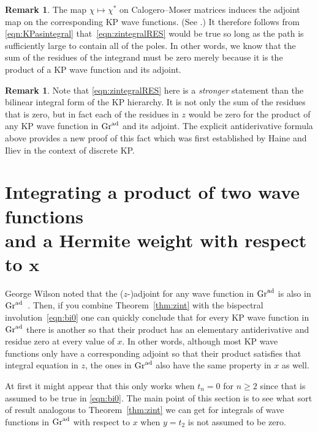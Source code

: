 \documentclass[10pt,a4paper]{amsart}
\numberwithin{equation}{section}
\theoremstyle{definition}
\newtheorem{Remark}[Theorem]{Remark}
\begin{document}
\begin{Remark}
The map $\chi\mapsto \chi^*$ on Calogero--Moser matrices induces the
adjoint map on the corresponding KP wave functions. (See \cite[Lemma 7.7]{WilsonCM}.)
It therefore follows from
\eqref{eqn:KPasintegral} that~\eqref{eqn:zintegralRES} would be true so long as the path is
sufficiently large to contain all of the poles. In other words,
we know that the sum of the residues of
the integrand must be zero merely because it is the product of a KP
wave function and its adjoint.
\end{Remark}
\begin{Remark}
Note that \eqref{eqn:zintegralRES} here is a \textit{stronger} statement
than the bilinear integral form of the KP hierarchy.
It is not only the sum of the residues that is zero, but in fact each
of the
residues in $z$ would be zero for the product of any KP wave function
in ${\rm Gr}^{\rm ad}$ and its adjoint.
The explicit antiderivative formula above provides a new proof of this fact which was first established
by Haine and Iliev \cite{HaineIliev} in the context of discrete KP.
\end{Remark}

\section[Integrating a product of two wave functions and a Hermite weight with respect to x]{Integrating a product of two wave functions\\ and a Hermite weight with respect to $ \boldsymbol{x}$}\label{sec:intx}

George Wilson noted that the ($z$-)adjoint for any wave function in
${\rm Gr}^{\rm ad}$ is also in ${\rm Gr}^{\rm ad}$~\cite{WilsonBisp}.
Then, if you combine Theorem~\ref{thm:zint}
with the bispectral involution~\eqref{eqn:bi0}
one can quickly conclude that for every KP wave function in ${\rm Gr}^{\rm ad}$ there is
another so that their product has an elementary antiderivative and
residue zero at every value of $x$. In other words, although most KP
wave functions only have a corresponding adjoint so that their product
satisfies that integral equation in $z$, the ones in ${\rm Gr}^{\rm ad}$ also have the same
property in $x$ as well.

At first it might
appear that this only works when $t_n=0$
for $n\geq 2$ since that is assumed to be true in \eqref{eqn:bi0}. The main point of this section is to see what sort of
result analogous to Theorem~\ref{thm:zint} we can get for integrals of
wave functions in ${\rm Gr}^{\rm ad}$ with respect to $x$ when $y=t_2$ is not
assumed to be zero.
\end{document}
